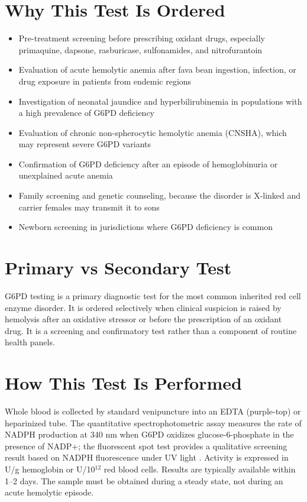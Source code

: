 \section*{Why This Test Is Ordered}
\begin{itemize}
  \item Pre-treatment screening before prescribing oxidant drugs, especially primaquine, dapsone, rasburicase, sulfonamides, and nitrofurantoin
  \item Evaluation of acute hemolytic anemia after fava bean ingestion, infection, or drug exposure in patients from endemic regions
  \item Investigation of neonatal jaundice and hyperbilirubinemia in populations with a high prevalence of G6PD deficiency
  \item Evaluation of chronic non-spherocytic hemolytic anemia (CNSHA), which may represent severe G6PD variants
  \item Confirmation of G6PD deficiency after an episode of hemoglobinuria or unexplained acute anemia
  \item Family screening and genetic counseling, because the disorder is X-linked and carrier females may transmit it to sons
  \item Newborn screening in jurisdictions where G6PD deficiency is common \cite{who1989glucose}
\end{itemize}
\section*{Primary vs Secondary Test}
G6PD testing is a primary diagnostic test for the most common inherited red cell enzyme disorder. It is ordered selectively when clinical suspicion is raised by hemolysis after an oxidative stressor or before the prescription of an oxidant drug. It is a screening and confirmatory test rather than a component of routine health panels.
\section*{How This Test Is Performed}
Whole blood is collected by standard venipuncture into an EDTA (purple-top) or heparinized tube. The quantitative spectrophotometric assay measures the rate of NADPH production at 340 nm when G6PD oxidizes glucose-6-phosphate in the presence of NADP+; the fluorescent spot test provides a qualitative screening result based on NADPH fluorescence under UV light \cite{beutler1968special}. Activity is expressed in U/g hemoglobin or U/10$^{12}$ red blood cells. Results are typically available within 1--2 days. The sample must be obtained during a steady state, not during an acute hemolytic episode.
